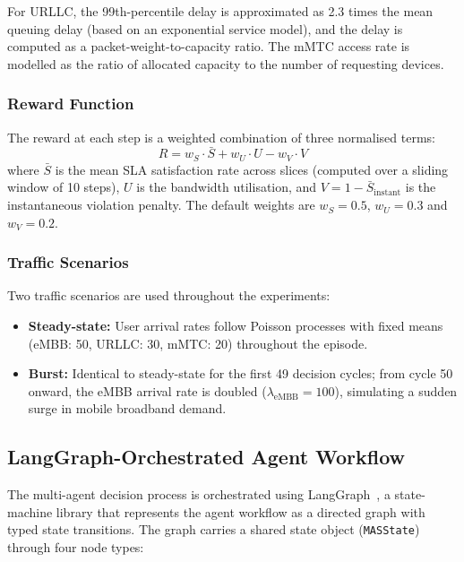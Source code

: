 For URLLC, the 99th-percentile delay is approximated as 2.3 times the mean queuing delay (based on an exponential service model), and the delay is computed as a packet-weight-to-capacity ratio. The mMTC access rate is modelled as the ratio of allocated capacity to the number of requesting devices.

\subsubsection{Reward Function}

The reward at each step is a weighted combination of three normalised terms:
\begin{equation}
    R = w_S \cdot \bar{S} + w_U \cdot U - w_V \cdot V
    \label{eq:reward}
\end{equation}
where $\bar{S}$ is the mean SLA satisfaction rate across slices (computed over a sliding window of 10 steps), $U$ is the bandwidth utilisation, and $V = 1 - \bar{S}_{\text{instant}}$ is the instantaneous violation penalty. The default weights are $w_S = 0.5$, $w_U = 0.3$ and $w_V = 0.2$.

\subsubsection{Traffic Scenarios}

Two traffic scenarios are used throughout the experiments:
\begin{itemize}
    \item \textbf{Steady-state:} User arrival rates follow Poisson processes with fixed means (eMBB: 50, URLLC: 30, mMTC: 20) throughout the episode.
    \item \textbf{Burst:} Identical to steady-state for the first 49 decision cycles; from cycle 50 onward, the eMBB arrival rate is doubled ($\lambda_{\text{eMBB}} = 100$), simulating a sudden surge in mobile broadband demand.
\end{itemize}

\subsection{LangGraph-Orchestrated Agent Workflow}

The multi-agent decision process is orchestrated using LangGraph~\cite{langchain2024langgraph}, a state-machine library that represents the agent workflow as a directed graph with typed state transitions. The graph carries a shared state object (\texttt{MASState}) through four node types:


